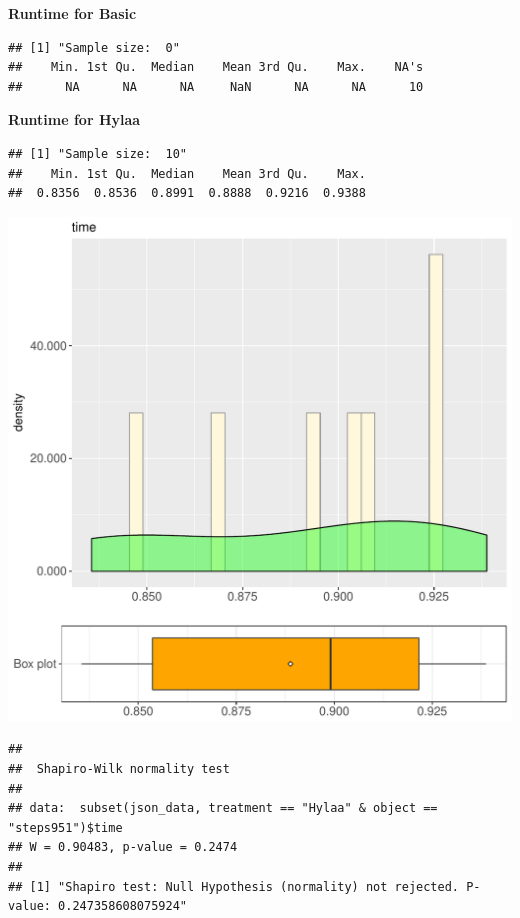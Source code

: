 \documentclass{article}\usepackage[]{graphicx}\usepackage[]{color}
\makeatletter
\def\maxwidth{ %
  \ifdim\Gin@nat@width>\linewidth
    \linewidth
  \else
    \Gin@nat@width
  \fi
}
\newenvironment{kframe}{%
 \def\at@end@of@kframe{}%
 \ifinner\ifhmode%
  \def\at@end@of@kframe{\end{minipage}}%
  \begin{minipage}{\columnwidth}%
 \fi\fi%
 \def\FrameCommand##1{\hskip\@totalleftmargin \hskip-\fboxsep
 \colorbox{shadecolor}{##1}\hskip-\fboxsep
     \hskip-\linewidth \hskip-\@totalleftmargin \hskip\columnwidth}%
 \MakeFramed {\advance\hsize-\width
   \@totalleftmargin\z@ \linewidth\hsize
   \@setminipage}}%
 {\par\unskip\endMakeFramed%
 \at@end@of@kframe}
\newenvironment{knitrout}{}{} %
\makeatother
\begin{document}
 \textbf{Runtime for Basic}
\begin{knitrout}
\color{fgcolor}\begin{kframe}
\begin{verbatim}
## [1] "Sample size:  0"
##    Min. 1st Qu.  Median    Mean 3rd Qu.    Max.    NA's 
##      NA      NA      NA     NaN      NA      NA      10
\end{verbatim}
\end{kframe}
\end{knitrout}
 \textbf{Runtime for Hylaa}
\begin{knitrout}
\color{fgcolor}\begin{kframe}
\begin{verbatim}
## [1] "Sample size:  10"
##    Min. 1st Qu.  Median    Mean 3rd Qu.    Max. 
##  0.8356  0.8536  0.8991  0.8888  0.9216  0.9388
\end{verbatim}
\end{kframe}
\includegraphics[width=\maxwidth]{figure/RH3_Hylaa_steps951-1} 
\begin{kframe}\begin{verbatim}
## 
## 	Shapiro-Wilk normality test
## 
## data:  subset(json_data, treatment == "Hylaa" & object == "steps951")$time
## W = 0.90483, p-value = 0.2474
## 
## [1] "Shapiro test: Null Hypothesis (normality) not rejected. P-value: 0.247358608075924"
\end{verbatim}
\end{kframe}
\end{knitrout}
  
\end{document}
